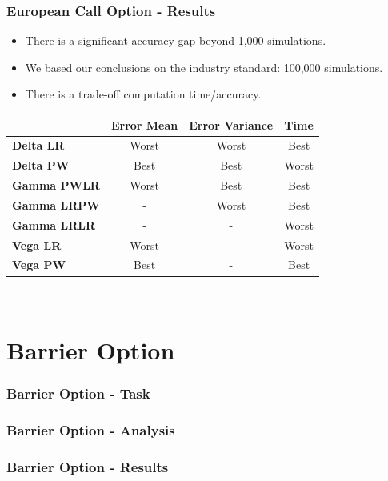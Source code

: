 \documentclass[11pt]{beamer}
\begin{document}
\begin{frame}
\frametitle{European Call Option - Results}
\begin{itemize}
  \item There is a significant accuracy gap beyond 1,000 simulations.
  \item We based our conclusions on the industry standard: 100,000 simulations.
  \item There is a trade-off computation time/accuracy.
\end{itemize}

\begin{table}
  \centering
\begin{tabular}{|l|c|c|c|}
\hline
& \textbf{Error Mean} & \textbf{Error Variance} & \textbf{Time} \\ \hline
\textbf{Delta LR} & Worst & Worst & Best\\
\textbf{Delta PW} & Best & Best & Worst\\ \hline
\textbf{Gamma PWLR} & Worst & Best & Best\\
\textbf{Gamma LRPW} & - & Worst & Best\\
\textbf{Gamma LRLR} & - & - & Worst\\ \hline
\textbf{Vega LR} & Worst & - & Worst\\
\textbf{Vega PW} & Best & - & Best\\ \hline
\end{tabular}\\

\end{table}

\end{frame}




\section{Barrier Option}
\begin{frame}
\frametitle{Barrier Option - Task}

\end{frame}

\begin{frame}
\frametitle{Barrier Option - Analysis}
\end{frame}

\begin{frame}
\frametitle{Barrier Option - Results}

\end{frame}
\end{document}
